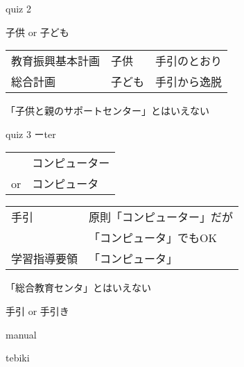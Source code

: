 \documentclass[
  ignorenonframetext,
  aspectratio=169]{beamer}
\begin{document}
\begin{frame}{quiz 2}
\protect\hypertarget{quiz-2}{}
\Huge

子供 or 子ども \pause

\bigskip

\large

\raggedleft
\begin{tabular}{@{}lll@{}}\toprule
教育振興基本計画&子供&手引のとおり\\\pause
総合計画&子ども&手引から逸脱\\\bottomrule
\end{tabular}
\pause

\vfill

「子供と親のサポートセンター」とはいえない
\end{frame}

\begin{frame}{quiz 3 ーter}
\protect\hypertarget{quiz-3-ux30fcter}{}
\Huge

\begin{tabular}{@{}ll@{}}
&コンピューター\\
or&コンピュータ
\end{tabular}

\pause

\vfill

\large
\raggedleft
\begin{tabular}{@{}ll@{}}\toprule
手引&原則「コンピューター」だが\\
&「コンピュータ」でもOK\\\pause
学習指導要領&「コンピュータ」\\\bottomrule
\end{tabular}
\pause

\vfill

「総合教育センタ」とはいえない
\end{frame}

\begin{frame}{手引 or 手引き}
\protect\hypertarget{ux624bux5f15-or-ux624bux5f15ux304d}{}
\end{frame}

\begin{frame}{manual}
\protect\hypertarget{manual-1}{}
\end{frame}

\begin{frame}{tebiki}
\protect\hypertarget{tebiki}{}
\vspace*{-20pt}
\end{frame}
\end{document}
